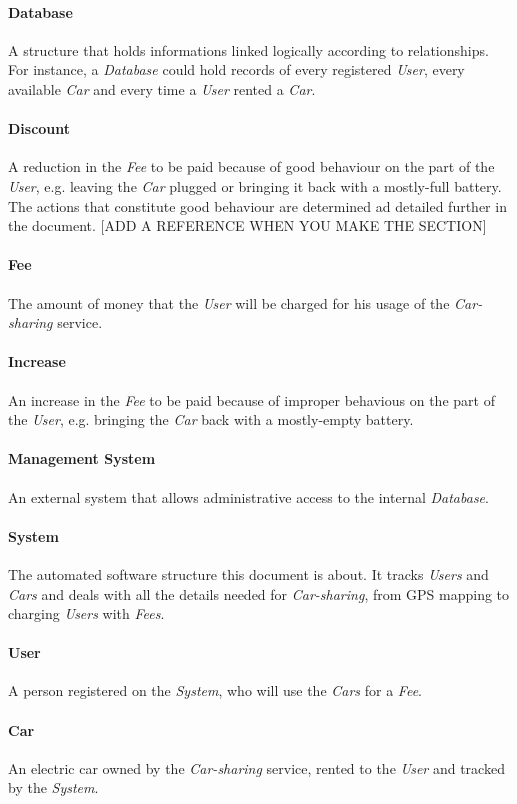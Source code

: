 \documentclass[12pt]{article}
\begin{document}
\paragraph{Database}
A structure that holds informations linked logically according to relationships. For instance, a \emph{Database} could hold records of every registered \emph{User}, every available \emph{Car} and every time a \emph{User} rented a \emph{Car}.
\paragraph{Discount}
A reduction in the \emph{Fee} to be paid because of good behaviour on the part of the \emph{User}, e.g. leaving the \emph{Car} plugged or bringing it back with a mostly-full battery. The actions that constitute good behaviour are determined ad detailed further in the document. [ADD A REFERENCE WHEN YOU MAKE THE SECTION]
\paragraph{Fee}
The amount of money that the \emph{User} will be charged for his usage of the \emph{Car-sharing} service.
\paragraph{Increase}
An increase in the \emph{Fee} to be paid because of improper behavious on the part of the \emph{User}, e.g. bringing the \emph{Car} back with a mostly-empty battery.
\paragraph{Management System}
An external system that allows administrative access to the internal \emph{Database}.
\paragraph{System}
The automated software structure this document is about. It tracks \emph{Users} and \emph{Cars} and deals with all the details needed for \emph{Car-sharing}, from GPS mapping to charging \emph{Users} with \emph{Fees}.
\paragraph{User}
A person registered on the \emph{System}, who will use the \emph{Cars} for a \emph{Fee}.
\paragraph{Car}
An electric car owned by the \emph{Car-sharing} service, rented to the \emph{User} and tracked by the \emph{System}.
\end{document}
